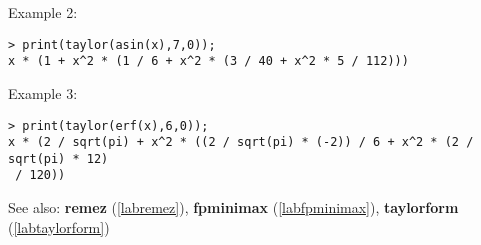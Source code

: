 \noindent Example 2: 
\begin{center}\begin{minipage}{15cm}\begin{Verbatim}[frame=single]
> print(taylor(asin(x),7,0));
x * (1 + x^2 * (1 / 6 + x^2 * (3 / 40 + x^2 * 5 / 112)))
\end{Verbatim}
\end{minipage}\end{center}
\noindent Example 3: 
\begin{center}\begin{minipage}{15cm}\begin{Verbatim}[frame=single]
> print(taylor(erf(x),6,0));
x * (2 / sqrt(pi) + x^2 * ((2 / sqrt(pi) * (-2)) / 6 + x^2 * (2 / sqrt(pi) * 12)
 / 120))
\end{Verbatim}
\end{minipage}\end{center}
See also: \textbf{remez} (\ref{labremez}), \textbf{fpminimax} (\ref{labfpminimax}), \textbf{taylorform} (\ref{labtaylorform})
